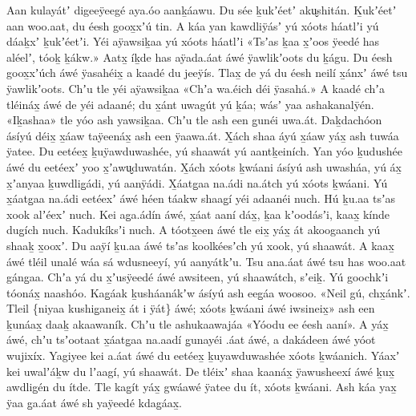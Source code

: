 \clearpage
\begin{pairs}
\begin{Leftside}
\beginnumbering
\pstart
\noindent
{}Aan kulayátʼ digeeÿeegé aya.óo aanḵáawu.
Du sée ḵukʼéetʼ aku̬shitán.
Ḵukʼéetʼ aan woo\-.aat, du éesh goox̱xʼú tin.
A káa yan kawdliÿásʼ yú xóots háatlʼi yú dáaḵxʼ ḵukʼéetʼi.
Yéi aÿawsi\-ḵaa yú xóots háatlʼi
«\!Tsʼas ḵaa x̱ʼoos ÿeedé has aléelʼ, tóoḵ ḵákw.\!»
Aatx̱ íḵde has aÿada.áat áwé ÿawlikʼoots du ḵágu.
Du éesh goox̱xʼúch áwé ÿa\-sahéix̱ a kaadé du jeeÿís.
Tlax̱ de yá du éesh neilí x̱ánxʼ áwé tsu ÿawlikʼoots.
Chʼu tle yéi aÿaw\-si\-ḵaa
«\!Chʼa wa.éich déi ÿasahá.\!»
A kaadé chʼa tléináx̱ áwé de yéi adaané;
du x̱ánt uwagút yú ḵáa;
wásʼ yaa ashakanalÿén.
«\!Iḵashaa\!» tle yóo ash yawsiḵaa.
Chʼu tle ash een g̱unéi uwa.át.
Daḵdachóon ásíyú déix̱ x̱áaw taÿeenáx̱ ash een ÿaawa.át.
X̱ách shaa áyú x̱áaw yáx̱ ash tuwáa ÿatee.
\pend
\pstart
{}Du eetéex̱ ḵuÿawduwashée, yú shaawát yú aantḵeiních.
Yan yóo ḵudushée áwé du eetéexʼ yoo x̱ʼawu̬duwatán.
X̱ách xóots ḵwáani ásíyú ash uwasháa, yú áx̱ x̱ʼanyaa ḵuwdlig̱ádi, yú aanÿádi.
X̱áatg̱aa na.ádi na\-.átch yú xóots ḵwáani.
Yú x̱áatg̱aa na.ádi eetéexʼ áwé héen táakw shaag̱í yéi adaanéi nuch.
Hú ḵu.aa tsʼas xook alʼéexʼ nuch.
Kei ag̱a.ádín áwé, x̱áat aaní dáx̱, ḵaa kʼoo\-dásʼi, kaax̱ kínde dug̱ích nuch.
Kadukíksʼi nuch.
A tóotx̱een áwé tle eix̱ yáx̱ át akoogaanch yú shaaḵ x̱ooxʼ.
Du aaÿí ḵu.aa áwé tsʼas koolkéesʼch yú xook, yú shaawát.
A kaax̱ áwé tléil unalé wáa sá wdusneeyí, yú aanyátkʼu.
\pend
\pstart
{}Tsu ana.áat áwé tsu has woo.aat gáng̱aa.
Chʼa yá du x̱ʼusÿeedé áwé awsiteen, yú shaa\-wátch, sʼeiḵ.
Yú goochkʼi tóonáx̱ naashóo.
Kag̱áak ḵusháanákʼw ásíyú ash eeg̱áa woo\-soo.
«\!Neil gú, chx̱ánkʼ.
Tleil \{niyaa kushi\-g̱aneix̱ át i ÿát\} áwé;
xóots ḵwáani áwé iwsineix̱\!»
ash een ḵunáax̱ daaḵ akaawaník.
Chʼu tle ashukaawajáa «\!Yóodu ee éesh aa\-ní\!».
A yáx̱ áwé, chʼu tsʼootaat x̱áatg̱aa na\-.aadí g̱unayéi .áat áwé,
a dakádeen áwé yóot wujixíx.
Yagiyee kei a.áat áwé du eetéex̱ ḵuyawduwashée xóots ḵwáanich.
Yáaxʼ kei uwalʼáḵw du lʼaagí, yú shaawát.
De tléixʼ shaa kaanáx̱ ÿawusheexí áwé ḵux̱ awdlig̱én du ítde.
Tle kag̱ít yáx̱ gwáawé ÿatee du ít, xóots ḵwáani.
Ash káa yax̱ ÿaa g̱a.áat áwé sh yaÿeedé kdag̱áax̱.

\end{Leftside}
\end{pairs}
